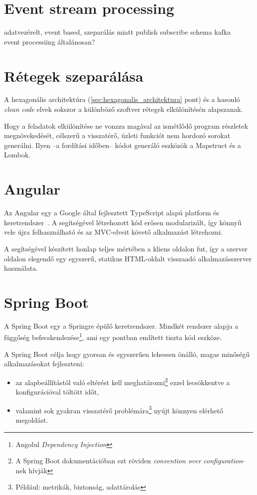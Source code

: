 \section{Event stream processing}
adatvezérelt, event based, szeparálás miatt 
publish subscribe
 schema
 kafka\\
event processiing általánosan?


\section{Rétegek szeparálása}\label{sec:retegek_szeparalasa}
A hexagonális architektúra (\ref{sec:hexagonalis_architektura} pont) és a hasonló \textit{clean code} \cite{clean_code_chapter_systems} elvek sokszor a különböző szoftver rétegek elkülönítésén alapszanak.


Hogy a feladatok elkülönítése ne vonzza magával az ismétlődő program részletek megnövekedését, célszerű a visszatérő, üzleti funkciót nem hordozó sorokat generálni. Ilyen --a fordítási időben-- kódot generáló eszközök a Mapstruct és a Lombok.


\section{Angular}\label{sec:angular}
Az \foreignlanguage{british}{Angular} egy a \foreignlanguage{british}{Google} által fejlesztett \foreignlanguage{british}{TypeScript} alapú platform és		 keretrendszer~\cite{angular_docs}. A segítségével létrehozott kód erősen modularizált, így könnyű vele újra felhasználható és az MVC-elveit követő alkalmazást létrehozni.

A segítségével készített honlap teljes mértében a kliens oldalon fut, így a szerver oldalon elegendő egy egyszerű, statikus HTML-oldalt visszaadó alkalmazásszerver használata.


\section{Spring Boot}\label{sec:spring_boot}
A \foreignlanguage{british}{Spring Boot} egy a Springre épülő keretrendszer. Mindkét rendszer alapja a függőség befecskendezése\footnote{Angolul \foreignlanguage{british}{\textit{Dependency Injection}}}, ami egy  pontban említett tiszta kód \cite{clean_code_chapter_systems} eszköze.

A Spring Boot \cite{introducing_spring_boot} célja hogy gyorsan és egyszerűen lehessen önálló, magas minőségű alkalmazásokat fejleszteni:
\begin{itemize}
	\item az alapbeállítástól való eltérést kell meghatározni\footnote{A Spring Boot dokumentációban ezt röviden \textit{convention over configuration}-nek hívják} ezzel lecsökkentve a konfigurációval töltött időt,
	\item valamint sok gyakran visszatérő problémára\footnote{Például: metrikák, biztonság, adattárolás} nyújt könnyen elérhető megoldást.
\end{itemize}



